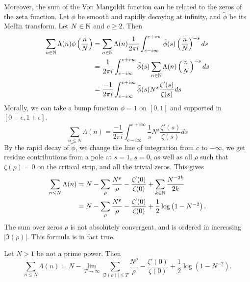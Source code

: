 Moreover, the sum of the Von Mangoldt function can be related to the zeros of the zeta function.
Let $\phi$ be smooth and rapidly decaying at infinity, and $\tilde{\phi}$ be its Mellin transform. Let $N\in\mathbb{N}$ and $c\geq 2$. Then \begin{equation} \label{mellinonzeta}
    \begin{split}
    \sum_{n\in\mathbb{N}} \Lambda(n) \phi\left(\frac{n}{N}\right) &=
    \sum_{n\in\mathbb{N}} \Lambda(n) \frac{1}{2\pi i}\int_{c-i\infty}^{c+i\infty}
    \tilde{\phi}(s)\left(\frac{n}{N}\right)^{-s} ds \\
    &= \frac{1}{2\pi i}\int_{c-i\infty}^{c+i\infty}
    \tilde{\phi}(s)\sum_{n\in\mathbb{N}} \Lambda(n) \left(\frac{n}{N}\right)^{-s} ds \\
    &= \frac{-1}{2\pi i}\int_{c-i\infty}^{c+i\infty}
    \tilde{\phi}(s) N^s \frac{\zeta'(s)}{\zeta(s)} ds \\
    \end{split}
\end{equation}
Morally, we can take a bump function $\phi=1$ on $[0,1]$ and supported in $[0-\epsilon, 1+\epsilon]$. 
\begin{equation}\label{preexplicit}
    \sum_{n\leq N} \Lambda(n)=
    \frac{-1}{2\pi i}\int_{c-i\infty}^{c+i\infty}
    \frac{1}{s} N^s \frac{\zeta'(s)}{\zeta(s)} ds
\end{equation}
By the rapid decay of $\tilde\phi$, we change the line of integration from $c$ to $-\infty$, we get residue contributions from
a pole at $s=1$, $s=0$, as well as all $\rho$ such that $\zeta(\rho)=0$ on the critical strip,
and all the trivial zeros. This gives \begin{equation}
    \begin{split}
        \sum_{n\leq N} \Lambda(n)&= N - \sum_{\rho} \frac{N^\rho}{\rho} -
        \frac{\zeta'(0)}{\zeta(0)} + \sum_{k\in\mathbb{N}}\frac{N^{-2k}}{2k} \\
        &= N - \sum_{\rho} \frac{N^\rho}{\rho} -
        \frac{\zeta'(0)}{\zeta(0)} + \frac{1}{2}\log\left(1-N^{-2}\right). 
    \end{split}
\end{equation}
The sum over zeros $\rho$ is not absolutely convergent, and is ordered in increasing $|\Im(\rho)|$.
This formula is in fact true.
\begin{theorem}
    Let $N>1$ be not a prime power. Then\begin{equation}
    \sum_{n\leq N} \Lambda(n) = N - \lim_{T\to \infty}\sum_{|\Im{(\rho)}|\leq T} \frac{N^\rho}{\rho} -
    \frac{\zeta'(0)}{\zeta(0)} + \frac{1}{2}\log\left(1-N^{-2}\right). 
    \end{equation}
\end{theorem}
